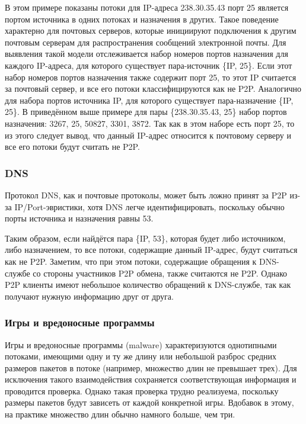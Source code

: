 \documentclass[bachelor, och, coursework]{SCWorks}
\begin{document}
В этом примере показаны потоки для IP-адреса 238.30.35.43 порт 25 является портом источника в одних потоках и назначения в других. Такое поведение характерно для почтовых серверов, которые инициируют подключения к другим почтовым серверам для распространения сообщений электронной почты. Для выявления такой модели отслеживается набор номеров портов назначения для каждого IP-адреса, для которого существует пара-источник \{IP, 25\}. Если этот набор номеров портов назначения также содержит порт 25, то этот IP считается за почтовый сервер, и все его потоки классифицируются как не P2P. Аналогично для набора портов источника IP, для которого существует пара-назначение \{IP, 25\}. В приведённом выше примере для пары \{238.30.35.43, 25\} набор портов назначения: 3267, 25, 50827, 3301, 3872. Так как в этом наборе есть порт 25, то из этого следует вывод, что данный IP-адрес относится к почтовому серверу и все его потоки будут считать не P2P.

\subsubsection{DNS}
Протокол DNS, как и почтовые протоколы, может быть ложно принят за P2P из-за IP/Port-эвристики, хотя DNS легче идентифицировать, поскольку обычно порты источника и назначения равны 53. 

Таким образом, если найдётся пара \{IP, 53\}, которая будет либо источником, либо назначением, то все потоки, содержащие данный IP-адрес, будут считаться как не P2P. Заметим, что при этом потоки,
содержащие обращения к DNS-службе со стороны участников P2P обмена, также считаются
не P2P. Однако P2P клиенты имеют небольшое количество обращений к DNS-службе, так
как получают нужную информацию друг от друга.

\subsubsection{Игры и вредоносные программы}
Игры и вредоносные программы (malware) характеризуются однотипными потоками,
имеющими одну и ту же длину или небольшой разброс средних размеров пакетов в потоке (например, множество длин не превышает трех). Для исключения такого взаимодействия сохраняется соответствующая информация и проводится проверка. Однако такая проверка трудно реализуема, поскольку размеры пакетов будут зависеть от каждой конкретной игры. Вдобавок в этому, на практике множество длин обычно намного больше, чем три. 
\end{document}
